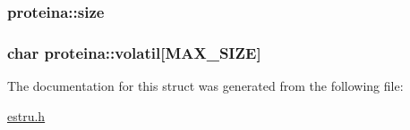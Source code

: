 \hypertarget{structproteina_a62d004265c69e8eb9abf29bfb77bf2f3}{
\subsubsection[{size}]{ proteina\-::size}}\label{structproteina_a62d004265c69e8eb9abf29bfb77bf2f3}
\hypertarget{structproteina_af0f779a87545cb00acb4ecdd86e47f5f}{
\subsubsection[{volatil}]{\setlength{\rightskip}{0pt plus 5cm}char proteina\-::volatil\mbox{[}{\bf M\-A\-X\-\_\-\-S\-I\-Z\-E}\mbox{]}}}\label{structproteina_af0f779a87545cb00acb4ecdd86e47f5f}


The documentation for this struct was generated from the following file\-:\begin{DoxyCompactItemize}
\item 
\hyperlink{estru_8h}{estru.\-h}\end{DoxyCompactItemize}

